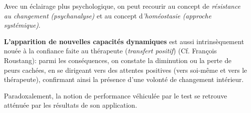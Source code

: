 Avec un éclairage plus psychologique, on peut recourir au concept de
\textit{résistance au changement (psychanalyse)} et au concept
d\textit{'homéostasie (approche systémique)}.

\textbf{L'apparition de nouvelles
capacités  dynamiques }est aussi intrinsèquement nouée à la confiance
faite au thérapeute (\textit{transfert positif}) (Cf. François
Roustang): parmi les conséquences, on constate la
diminution ou la perte de peurs cachées,  en se dirigeant vers des
attentes positives (vers soi-même et vers le thérapeute), confirmant ainsi la
présence d'une volonté de changement intérieur.

Paradoxalement, la notion de performance véhiculée par le test se
retrouve atténuée par les résultats de son application.














